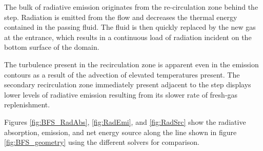 The bulk of radiative emission originates from the re-circulation zone behind the step. Radiation is emitted from the flow and decreases the thermal energy contained in the passing fluid. 
The fluid is then quickly replaced by the new gas at the entrance, which results in a continuous load of radiation incident on the bottom surface of the domain. 

The turbulence present in the recirculation zone is apparent even in the emission contours as a result of the advection of elevated temperatures present. The secondary recirculation zone immediately present adjacent to the step displays lower levels of radiative emission resulting from its slower rate of fresh-gas replenishment.

Figures \ref{fig:BFS_RadAbs}, \ref{fig:RadEmi}, and \ref{fig:RadSrc} show the radiative absorption, emission, and net energy source along the line shown in figure \ref{fig:BFS_geometry} using the different solvers for comparison. 


